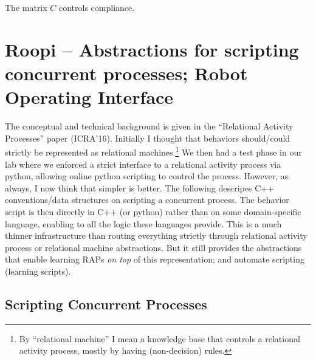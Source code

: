 \documentclass[10pt,fleqn,twoside]{article}
\begin{document}
{{\begin{description}
The matrix $C$ controls compliance.



\item[Measured-force limits]

\item[Limit Energy]

\end{description}


\section{Roopi -- Abstractions for scripting concurrent processes;
  Robot Operating Interface}

The conceptual and technical background is given in the "`Relational
Activity Processes"' paper (ICRA'16). Initially I thought that
behaviors should/could strictly be represented as relational
machines.\footnote{By ``relational machine'' I mean a knowledge base
  that controls a relational activity process, mostly by having
  (non-decision) rules.} We then had a test phase in our lab where we
enforced a strict interface to a relational activity process via
python, allowing online python scripting to control the
process. However, as always, I now think that simpler is better. The
following descripes C++ conventions/data structures on scripting a
concurrent process. The behavior script is then directly in C++ (or
python) rather than on some domain-specific language, enabling to
all the logic these languages provide. This is a much thinner
infrastructure than routing everything strictly through relational
activity process or relational machine abstractions. But it still
provides the abstractions that enable learning RAPs \emph{on top} of
this representation; and automate scripting (learning scripts).


\subsection{Scripting Concurrent Processes}

}}
\end{document}
